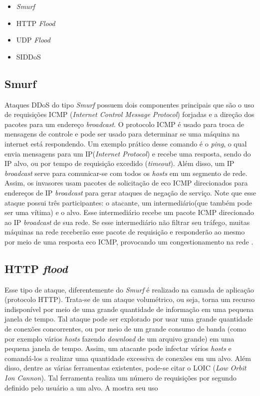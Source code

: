\begin{itemize}
	 \item \textit{Smurf}
	 \item HTTP \textit{Flood}
	 \item UDP \textit{Flood}
	 \item SIDDoS

\end{itemize}

\subsection{Smurf}
Ataques DDoS do tipo \textit{Smurf} possuem dois componentes principais que são o uso de requisições ICMP (\textit{Internet Control Message Protocol}) forjadas e a direção dos pacotes para um endereço \textit{broadcast}. O protocolo ICMP  é usado para troca de mensagens de controle e pode ser usado para determinar se uma máquina na internet está respondendo. Um exemplo prático desse comando é o \textit{ping}, o qual envia mensagens para um IP(\textit{Internet Protocol}) e recebe uma resposta, sendo do IP alvo, ou por tempo de requisição excedido (\textit{timeout}). Além disso, um IP \textit{broadcast} serve para comunicar-se com todos os \textit{hosts} em um segmento de rede. Assim, os invasores usam pacotes de solicitação de eco ICMP direcionados para endereços de IP \textit{broadcast} para gerar ataques de negação de serviço. Note que esse ataque possui três participantes: o atacante, um intermediário(que também pode ser uma vítima) e o alvo. Esse intermediário recebe um pacote ICMP direcionado ao IP \textit{broadcast} de sua rede. Se esse intermediário não filtrar seu tráfego, muitas máquinas na rede receberão esse pacote de requisição e responderão ao mesmo por meio de uma resposta eco ICMP, provocando um congestionamento na rede \cite{certSmurf}.
\subsection{HTTP \textit{flood}}
Esse tipo de ataque, diferentemente do \textit{Smurf} é realizado na camada de aplicação (protocolo HTTP). Trata-se de um ataque volumétrico, ou seja, torna um recurso indisponível por meio de uma grande quantidade de informação em uma pequena janela de tempo. Tal ataque pode ser explorado por  usar uma grande quantidade de conexões concorrentes, ou por meio de um grande consumo de banda (como por exemplo vários \textit{hosts} fazendo \textit{download} de um arquivo grande) em uma pequena janela de tempo. Assim, um atacante pode infectar vários \textit{hosts} e comandá-los a realizar uma quantidade excessiva de conexões em um alvo. Além disso, dentre as várias ferramentas existentes, pode-se citar o LOIC (\textit{Low Orbit Ion Cannon}). Tal ferramenta realiza um número de requisições por segundo definido pelo usuário a um alvo. A  mostra seu uso 
 

